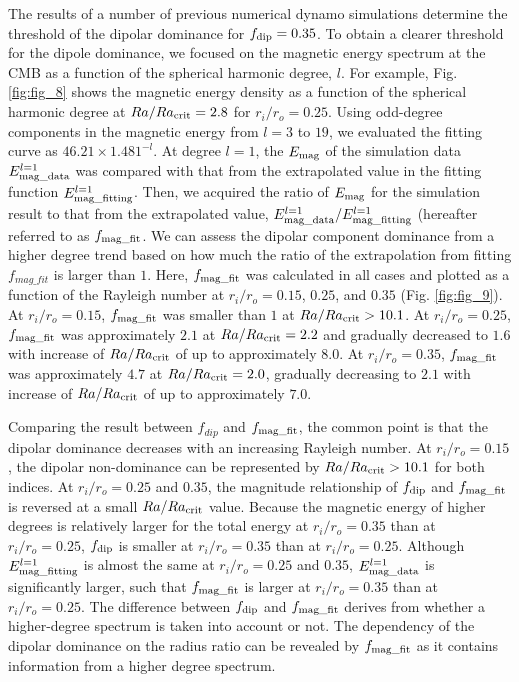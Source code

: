 The results of a number of previous numerical dynamo simulations determine the threshold of the dipolar dominance for $f_{\rm dip} = 0.35$. 
To obtain a clearer threshold for the dipole dominance, we focused on the magnetic energy spectrum at the CMB as a function of the spherical harmonic degree, $l$. 
For example, Fig. \ref{fig:fig_8} shows the magnetic energy density as a function of the spherical harmonic degree at $Ra/Ra_{\rm crit} = 2.8$ for $r_i/r_o = 0.25$. 
Using odd-degree components in the magnetic energy from $l = 3$ to $19$, we evaluated the fitting curve as $46.21 \times 1.481^{-l}$. 
At degree $l = 1$, the $E_{\rm mag}$ of the simulation data $E_{\rm mag\_data}^{l = 1}$ was compared with that from the extrapolated value in the fitting function $E_{\rm mag\_fitting}^{l = 1}$. 
Then, we acquired the ratio of $E_{\rm mag}$ for the simulation result to that from the extrapolated value, $E_{\rm mag\_data}^{l = 1}/E_{\rm mag\_fitting}^{l=1}$ (hereafter referred to as $f_{\rm mag\_fit}$. 
We can assess the dipolar component dominance from a higher degree trend based on how much the ratio of the extrapolation from fitting $f_{mag\_fit}$ is larger than $1$. 
Here, $f_{\rm mag\_fit}$ was calculated in all cases and plotted as a function of the Rayleigh number at $r_i/r_o = 0.15$, $0.25$, and $0.35$ (Fig. \ref{fig:fig_9}). 
At $r_i/r_o = 0.15$, $f_{\rm mag\_fit}$ was smaller than $1$ at $Ra/Ra_{\rm crit} > 10.1$. 
At $r_i/r_o = 0.25$, $f_{\rm mag\_fit}$ was approximately $2.1$ at $Ra/Ra_{\rm crit} = 2.2$ and gradually decreased to $1.6$ with increase of $Ra/Ra_{\rm crit}$ of up to approximately $8.0$. 
At $r_i/r_o = 0.35$, $f_{\rm mag\_fit}$ was approximately $4.7$ at $Ra/Ra_{\rm crit} = 2.0$, gradually decreasing to $2.1$ with increase of $Ra/Ra_{\rm crit}$ of up to approximately $7.0$.

Comparing the result between $f_{dip}$ and $f_{\rm mag\_fit}$, the common point is that the dipolar dominance decreases with an increasing Rayleigh number. 
At $r_i/r_o = 0.15$, the dipolar non-dominance can be represented by $Ra/Ra_{\rm crit} > 10.1$ for both indices. 
At $r_i/r_o = 0.25$ and $0.35$, the magnitude relationship of $f_{\rm dip}$ and $f_{\rm mag\_fit}$ is reversed at a small $Ra/Ra_{\rm crit}$ value. 
Because the magnetic energy of higher degrees is relatively larger for the total energy at $r_i/r_o = 0.35$ than at $r_i/r_o = 0.25$, $f_{\rm dip}$ is smaller at $r_i/r_o = 0.35$ than at $r_i/r_o = 0.25$. 
Although $E_{\rm mag\_fitting}^{l = 1}$ is almost the same at $r_i/r_o = 0.25$ and $0.35$, $E_{\rm mag\_data}^{l = 1}$ is significantly larger, such that $f_{\rm mag\_fit}$ is larger at $r_i/r_o = 0.35$ than at $r_i/r_o = 0.25$. 
The difference between $f_{\rm dip}$ and $f_{\rm mag\_fit}$ derives from whether a higher-degree spectrum is taken into account or not. 
The dependency of the dipolar dominance on the radius ratio can be revealed by $f_{\rm mag\_fit}$ as it contains information from a higher degree spectrum.

